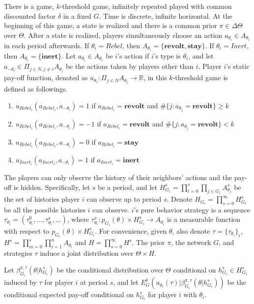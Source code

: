 \documentclass[12pt,letter]{article}
\theoremstyle{definition}
\theoremstyle{remark}
\theoremstyle{claim}
\begin{document}
There is a game, $k$-threshold game, infinitely repeated played with common discounted factor $\delta$ in a fixed $G$. Time is discrete, infinite horizontal. At the beginning of this game, a state is realized and there is a common prior $\pi\in \Delta \Theta$ over $\Theta$. After a state is realized, players simultaneously choose an action $a_{\theta_i}\in A_{\theta_i}$ in each period afterwards. If $\theta_i=Rebel$, then $A_{\theta_i}=\{\textbf{revolt}, \textbf{stay}\}$.  If $\theta_i=Inert$, then $A_{\theta_i}=\{\textbf{inert}\}$. Let $a_{\theta_i}\in A_{\theta_i}$ be $i$'s action if $i$'s type is $\theta_i$, and let $a_{-\theta_i}\in \Pi_{j\in N,j\neq i}A_{\theta_j}$ be the actions taken by players other than $i$. Player $i$'s static pay-off function, denoted as $u_{\theta_i}: \Pi_{j\in N}A_{\theta_j}\rightarrow \mathbb{R}$, in this $k$-threshold game is defined as followings. 
\begin{enumerate}
\item $u_{Rebel_i}(a_{Rebel_i},a_{-\theta_i})=1$ if $a_{Rebel_i}=\textbf{revolt}$ and $\#\{j:a_{\theta_j}=\textbf{revolt}\}\geq k$
\item $u_{Rebel_i}(a_{Rebel_i},a_{-\theta_i})=-1$ if $a_{Rebel_i}=\textbf{revolt}$ and $\#\{j:a_{\theta_j}=\textbf{revolt}\}< k$
\item $u_{Rebel_i}(a_{Rebel_i},a_{-\theta_i})=0$ if $a_{Rebel_i}=\textbf{stay}$
\item $u_{Inert_i}(a_{Inert_i},a_{-\theta_i})=1$ if $a_{Inert_i}=\textbf{inert}$
\end{enumerate}

The players can only observe the history of their neighbors' actions and the pay-off is hidden. Specifically, let $s$ be a period, and let $H^s_{G_i}=\prod^s_{t=0}\prod_{j\in G_i}A^s_{\theta_j}$ be the set of histories player $i$ can observe up to period $s$. Denote $H_{G_i}=\prod^{\infty}_{s=0}H^s_{G_i}$ be all the possible histories $i$ can observe. $i$'s pure behavior strategy is a sequence $\tau_{\theta_i}=(\tau^0_{\theta_i},...,\tau^s_{\theta_i},...)$, where $\tau^s_{\theta_i}: p_{G_i}(\theta)\times H^s_{G_i}\rightarrow A_{\theta_i}$ is a  measurable function with respect to $p_{G_i}(\theta)\times H^s_{G_i}$. For convenience, given $\theta$, also denote $\tau=\{\tau_{\theta_i}\}_i$,  $H^s=\prod^s_{m=0}\prod^n_{i=1}A_{\theta_i}$ and $H=\prod^{\infty}_{s=0}H^s$. The prior $\pi$, the network $G$, and strategies $\tau$ induce a joint distribution over $\Theta\times H$. 

Let 
$\beta^{\pi,\tau}_{G_i}(\theta|h^{s}_{G_i})$
be the conditional distribution over $\Theta$ conditional on $h^{s}_{G_i}\in H^s_{G_i}$ induced by $\tau$ for player $i$ at period $s$, and let
$E^{\delta}_G(u_{\theta_i}(\tau)|\beta^{\pi,\tau}_{G_i}(\theta|h^{s}_{G_i}))$
be the conditional expected pay-off conditional on $h^{s}_{G_i}$ for player $i$ with ${\theta_i}$.
\end{document}
